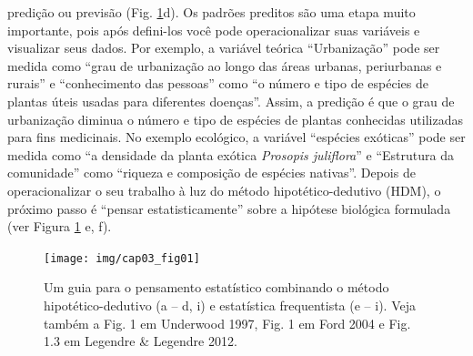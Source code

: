 \documentclass[
]{book}
\begin{document}
predição ou previsão (Fig. \ref{fig:fig-statistical-thinking}d). Os padrões preditos são uma etapa muito importante, pois após defini-los você pode operacionalizar suas variáveis e visualizar seus dados. Por exemplo, a variável teórica ``Urbanização'' pode ser medida como ``grau de urbanização ao longo das áreas urbanas, periurbanas e rurais'' e ``conhecimento das pessoas'' como ``o número e tipo de espécies de plantas úteis usadas para diferentes doenças''. Assim, a predição é que o grau de urbanização diminua o número e tipo de espécies de plantas conhecidas utilizadas para fins medicinais. No exemplo ecológico, a variável ``espécies exóticas'' pode ser medida como ``a densidade da planta exótica \emph{Prosopis juliflora}'' e ``Estrutura da comunidade'' como ``riqueza e composição de espécies nativas''. Depois de operacionalizar o seu trabalho à luz do método hipotético-dedutivo (HDM), o próximo passo é ``pensar estatisticamente'' sobre a hipótese biológica formulada (ver Figura \ref{fig:fig-statistical-thinking} e, f).

\begin{figure}

{\centering \texttt{[image: img/cap03\_fig01]} 

}

\caption{Um guia para o pensamento estatístico combinando o método hipotético-dedutivo (a -- d, i) e estatística frequentista (e -- i). Veja também a Fig. 1 em Underwood 1997, Fig. 1 em Ford 2004 e Fig. 1.3 em Legendre & Legendre 2012.}\label{fig:fig-statistical-thinking}
\end{figure}
\end{document}
